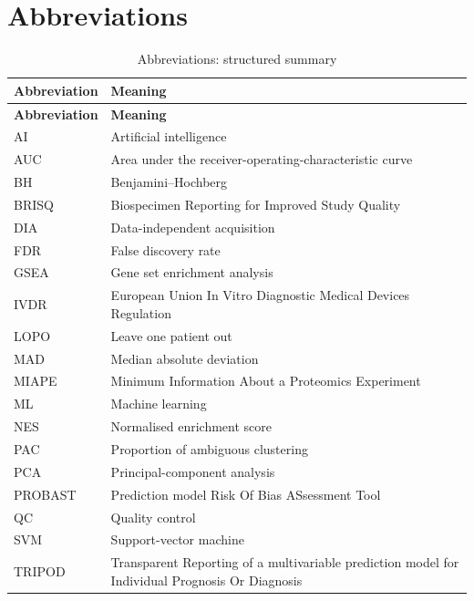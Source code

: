 \chapter*{Abbreviations}
\label{chap:abbreviations}

\begin{longtable}{@{}>{\raggedright\arraybackslash}p{} >{\raggedright\arraybackslash}p{}@{}}
\caption{Abbreviations: structured summary}\\
\toprule
\textbf{Abbreviation} & \textbf{Meaning} \\
\midrule
\endfirsthead
\toprule
\textbf{Abbreviation} & \textbf{Meaning} \\
\midrule
\endhead
AI & Artificial intelligence \\
AUC & Area under the receiver-operating-characteristic curve \\
BH & Benjamini–Hochberg \\
BRISQ & Biospecimen Reporting for Improved Study Quality \\
DIA & Data-independent acquisition \\
FDR & False discovery rate \\
GSEA & Gene set enrichment analysis \\
IVDR & European Union In Vitro Diagnostic Medical Devices Regulation \\
LOPO & Leave one patient out \\
MAD & Median absolute deviation \\
MIAPE & Minimum Information About a Proteomics Experiment \\
ML & Machine learning \\
NES & Normalised enrichment score \\
PAC & Proportion of ambiguous clustering \\
PCA & Principal-component analysis \\
PROBAST & Prediction model Risk Of Bias ASsessment Tool \\
QC & Quality control \\
SVM & Support-vector machine \\
TRIPOD & Transparent Reporting of a multivariable prediction model for Individual Prognosis Or Diagnosis \\
\bottomrule
\end{longtable}
